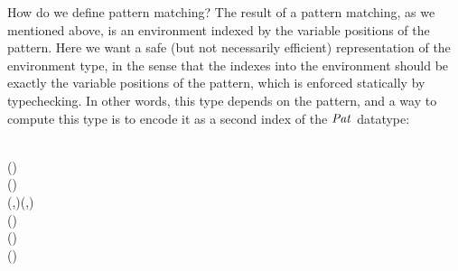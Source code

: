 How do we define pattern matching?
The result of a pattern matching, as we mentioned above, is an environment indexed by the variable positions of the pattern.
Here we want a safe (but not necessarily efficient) representation of the environment type, in the sense that the indexes into the environment should be exactly the variable positions of the pattern, which is enforced statically by typechecking.
In other words, this type depends on the pattern, and a way to compute this type is to encode it as a second index of the \ensuremath{\Conid{Pat}} datatype:
\begin{hscode}\SaveRestoreHook
{}%
%
%
%
%
%
%
%
\>[B]{}\;\;\;\;\<[E]%
\\
\>[B]{}\<[3]%
\>[3]{}\<[11]%
\>[11]{}\mathbin{::}{}\<[11E]%
\>[15]{}\;\Rightarrow {}\;\;(\;){}\<[E]%
\\
\>[B]{}\<[3]%
\>[3]{}\<[11]%
\>[11]{}\mathbin{::}{}\<[11E]%
\>[15]{}\;\Rightarrow {}\to {}\;\;(){}\<[E]%
\\
\>[B]{}\<[3]%
\>[3]{}\<[11]%
\>[11]{}\mathbin{::}{}\<[11E]%
\>[15]{}\;\;{}\<[22]%
\>[22]{}\<[26]%
\>[26]{}\to {}\;\;\;\to {}\;(,)\;(,){}\<[E]%
\\
\>[B]{}\<[3]%
\>[3]{}\<[11]%
\>[11]{}\mathbin{::}{}\<[11E]%
\>[15]{}\;\;{}\<[22]%
\>[22]{}\<[26]%
\>[26]{}\to {}\;(\;\;)\;\<[E]%
\\
\>[B]{}\<[3]%
\>[3]{}\<[11]%
\>[11]{}\mathbin{::}{}\<[11E]%
\>[15]{}\;\;{}\<[22]%
\>[22]{}\<[26]%
\>[26]{}\to {}\;(\;\;)\;\<[E]%
\\
\>[B]{}\<[3]%
\>[3]{}\<[11]%
\>[11]{}\mathbin{::}{}\<[11E]%
\>[15]{}\;\Rightarrow {}\;(\;)\;\;\to {}\;\;\<[E]%
\ColumnHook
\end{hscode}\resethooks
